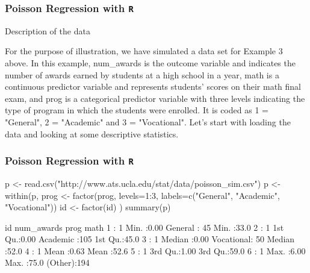 \documentclass[00-GLMregslides.tex]{subfiles}
\begin{document}
\begin{frame}[fragile]

\frametitle{Poisson Regression with \texttt{R}}
\Large
Description of the data

For the purpose of illustration, we have simulated a data set for Example 3 above. In this example, num_awards is the outcome variable and indicates the number of awards earned by students at a high school in a year, math is a continuous predictor variable and represents students' scores on their math final exam, and prog is a categorical predictor variable with three levels indicating the type of program in which the students were enrolled. It is coded as 1 = "General", 2 = "Academic" and 3 = "Vocational". Let's start with loading the data and looking at some descriptive statistics.
\end{frame}

\begin{frame}[fragile]

\frametitle{Poisson Regression with \texttt{R}}
\Large


p <- read.csv("http://www.ats.ucla.edu/stat/data/poisson_sim.csv")
p <- within(p, {
  prog <- factor(prog, levels=1:3, labels=c("General", "Academic", "Vocational"))
  id <- factor(id)
})
summary(p)
 
        id        num_awards           prog          math     
  1      :  1   Min.   :0.00   General   : 45   Min.   :33.0  
  2      :  1   1st Qu.:0.00   Academic  :105   1st Qu.:45.0  
  3      :  1   Median :0.00   Vocational: 50   Median :52.0  
  4      :  1   Mean   :0.63                    Mean   :52.6  
  5      :  1   3rd Qu.:1.00                    3rd Qu.:59.0  
  6      :  1   Max.   :6.00                    Max.   :75.0  
  (Other):194
 
\end{frame}
\end{document}
